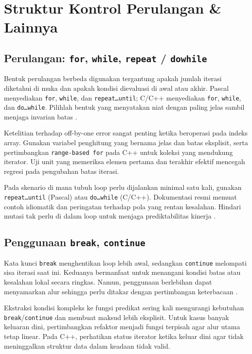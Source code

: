 \documentclass[../main.tex]{subfiles}
\begin{document}
\chapter{Struktur Kontrol Perulangan \& Lainnya}
\section{Perulangan: \texttt{for}, \texttt{while}, \texttt{repeat} / \texttt{do\textendash while}}
Bentuk perulangan berbeda digunakan tergantung apakah jumlah iterasi diketahui di muka dan apakah kondisi dievaluasi di awal atau akhir. Pascal menyediakan \texttt{for}, \texttt{while}, dan \texttt{repeat\ldots until}; C/C++ menyediakan \texttt{for}, \texttt{while}, dan \texttt{do\ldots while}. Pilihlah bentuk yang menyatakan niat dengan paling jelas sambil menjaga invarian batas \parencite{free-pascal-docs,gnu-c-manual,cpp-reference}.

Ketelitian terhadap off-by-one error sangat penting ketika beroperasi pada indeks array. Gunakan variabel penghitung yang bernama jelas dan batas eksplisit, serta pertimbangkan \texttt{range-based for} pada C++ untuk koleksi yang mendukung iterator. Uji unit yang memeriksa elemen pertama dan terakhir efektif mencegah regresi pada pengubahan batas iterasi.

Pada skenario di mana tubuh loop perlu dijalankan minimal satu kali, gunakan \texttt{repeat\ldots until} (Pascal) atau \texttt{do\ldots while} (C/C++). Dokumentasi resmi memuat contoh idiomatik dan peringatan terhadap pola yang rentan kesalahan. Hindari mutasi tak perlu di dalam loop untuk menjaga prediktabilitas kinerja \parencite{free-pascal-docs,gnu-c-manual,cpp-reference}.

\section{Penggunaan \texttt{break}, \texttt{continue}}
Kata kunci \texttt{break} menghentikan loop lebih awal, sedangkan \texttt{continue} melompati sisa iterasi saat ini. Keduanya bermanfaat untuk menangani kondisi batas atau kesalahan lokal secara ringkas. Namun, penggunaan berlebihan dapat menyamarkan alur sehingga perlu ditakar dengan pertimbangan keterbacaan \parencite{gnu-c-manual,cpp-reference}.

Ekstraksi kondisi kompleks ke fungsi predikat sering kali mengurangi kebutuhan \texttt{break}/\texttt{continue} dan membuat maksud lebih eksplisit. Untuk kasus banyak keluaran dini, pertimbangkan refaktor menjadi fungsi terpisah agar alur utama tetap linear. Pada C++, perhatikan status iterator ketika keluar dini agar tidak meninggalkan struktur data dalam keadaan tidak valid.
\end{document}
